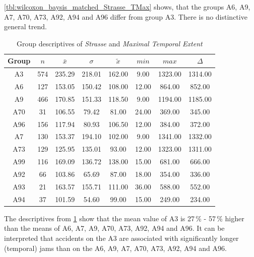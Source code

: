 \cref{tbl:wilcoxon_baysis_matched_Strasse_TMax} shows, that the groups A6, A9, A7, A70, A73, A92, A94 and A96 differ from group A3. There is no distinctive general trend.
\begin{table}[ht]
	\tiny
	\centering
	\begin{tabular}{c|c|c|c|c|c|c|c}
		\toprule
		Group & $n$ & $\bar{x}$ & $\sigma$ & $\tilde{x}$ & $min$ & $max$ & $\Delta$ \\ 
		\midrule
		A3 & 574 & 235.29 & 218.01 & 162.00 & 9.00 & 1323.00 & 1314.00   \\ 
		A6 & 127 & 153.05 & 150.42 & 108.00 & 12.00 & 864.00 & 852.00   \\ 
		A9 & 466 & 170.85 & 151.33 & 118.50 & 9.00 & 1194.00 & 1185.00   \\ 
		A70 & 31 & 106.55 & 79.42 & 81.00 & 24.00 & 369.00 & 345.00   \\ 
		A96 & 156 & 117.94 & 80.93 & 106.50 & 12.00 & 384.00 & 372.00   \\ 
		A7 & 130 & 153.37 & 194.10 & 102.00 & 9.00 & 1341.00 & 1332.00  \\ 
		A73 & 129 & 125.95 & 135.01 & 93.00 & 12.00 & 1323.00 & 1311.00  \\ 
		A99 & 116 & 169.09 & 136.72 & 138.00 & 15.00 & 681.00 & 666.00  \\ 
		A92 & 66 & 103.86 & 65.69 & 87.00 & 18.00 & 354.00 & 336.00 \\ 
		A93 & 21 & 163.57 & 155.71 & 111.00 & 36.00 & 588.00 & 552.00   \\ 
		A94 & 37 & 101.59 & 54.60 & 99.00 & 15.00 & 249.00 & 234.00 \\ 
 		\bottomrule
	\end{tabular}
	\caption{Group descriptives of \textit{Strasse} and \textit{Maximal Temporal Extent}}
	\label{tbl:descriptives_baysis_matched_Strasse_TMax}
\end{table}
The descriptives from \cref{tbl:descriptives_baysis_matched_Strasse_TMax} show that the mean value of A3 is 27\,\% - 57\,\% higher than the means of A6, A7, A9, A70, A73, A92, A94 and A96. It can be interpreted that accidents on the A3 are associated with significantly longer (temporal) jams than on the A6, A9, A7, A70, A73, A92, A94 and A96.

